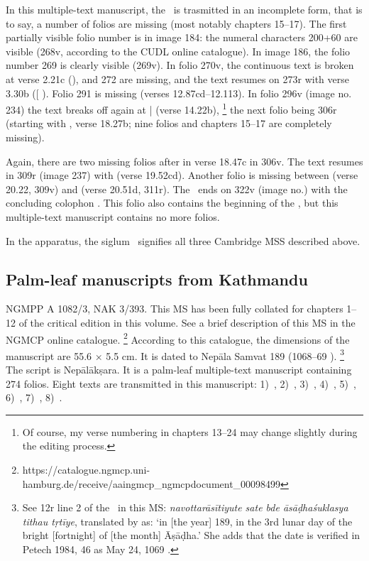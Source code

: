 In this multiple-text manuscript, the \VSS\ is trasmitted in an incomplete
form, that is to say, a number of folios are missing (most notably
chapters 15--17). The first partially visible folio number is in image
184: the numeral characters 200+60 are visible (268v, according to the
CUDL online catalogue). In image 186, the folio number 269 is clearly
visible (\fol269v). In folio 270v, the continuous text is broken at verse
2.21c (),  and 272 are missing, and the text
resumes on \fol273r with verse 3.30b ({[}\skt{ahiṃsā
pa}{]} ). Folio 291 is missing (verses
12.87cd--12.113). In folio 296v (image no. 234) the text breaks off
again at  |  (verse 14.22b),%
        \footnote{Of course, my verse numbering in chapters 13--24 may change slightly
                  during the editing process.}
the next folio being 306r (starting with ,
verse 18.27b; nine folios and chapters 15--17 are completely
missing).

Again, there are two missing folios after  in
verse 18.47c in \fol306v. The text resumes in \fol309r (image 237)
with  (verse 19.52cd). Another folio is missing between  (verse
20.22, \fol309v) and  (verse 20.51d, \fol311r). The \VSS\ ends on \fol322v (image no.) with the
concluding colophon . 
This folio also contains the beginning of the , 
but this multiple-text manuscript contains no more folios.

In the apparatus, the siglum \mssCaCbCc\ signifies all three Cambridge 
MSS described above.

\medskip
\subsection{Palm-leaf manuscripts from Kathmandu}
NGMPP A 1082/3, NAK 3/393. This MS has been fully 
collated for chapters 1--12 of the critical edition in this volume. 
See a brief description of this MS in
the NGMCP online catalogue.%
	\footnote{https://catalogue.ngmcp.uni-hamburg.de/receive/aaingmcp\_ngmcpdocument\_00098499}
According to this catalogue, the dimensions of the 
manuscript are 55.6 × 5.5 cm. 
It is dated to Nepāla Samvat 189 (1068--69 \CE).%
	\footnote{See \fol12r line 2 of the 
	\DharmP\ in this MS: 
	\emph{navottarāsītiyute sate bde āsāḍhaśuklasya
  tithau tṛtīye}, translated by  as: 
  `in {[}the year{]} 189, in the 3rd lunar day of the bright {[}fortnight{]}
  of {[}the month{]} Āṣāḍha.' She adds that the date is verified in
  Petech 1984, 46 as May 24, 1069 \CE.} The script is Nepālākṣara. It is
a palm-leaf multiple-text manuscript containing 274 folios. Eight texts
are transmitted in this manuscript: 
1)~\SDhS,
2)~\SDhU,
3)~\SDhSangr,
4)~\Ums,
5)~\SivaUp,
6)~\Vss,
7)~\DharmP,
8)~\Uums.

